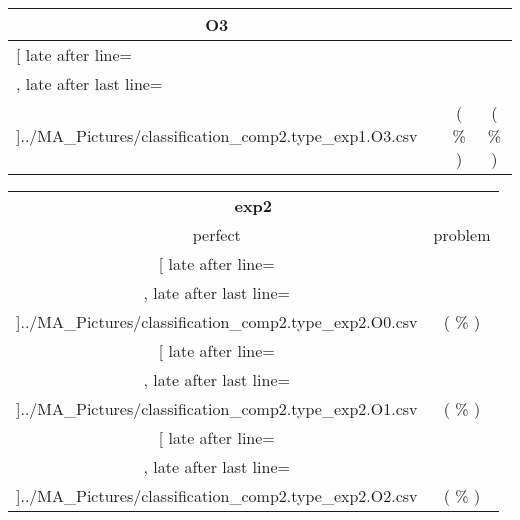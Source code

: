 \begin{table}[!htbp]
{\begin{tabular}{l|c|c|c}
\multicolumn{1}{c}{\bfseries O3}
	\\\midrule
	\csvreader[ late after line=\\, late after last line=\\\bottomrule]{../MA_Pictures/classification_comp2.type_exp1.O3.csv}{
}
	{\csvcolii  &  \csvcoliii & \csvcoliv ( \csvcolv \% ) & \csvcolvi( \csvcolvii\% )}%


    	\end{tabular}

	\begin{tabular}{|c|c}%

	\toprule
    \multicolumn{2}{c}{\bfseries exp2}\\
	
	     perfect &  problem %
	\\\midrule
	\csvreader[ late after line=\\, late after last line=\\\midrule]{../MA_Pictures/classification_comp2.type_exp2.O0.csv}{
}
	{\csvcoliv ( \csvcolv \% ) & \csvcolvi( \csvcolvii\% )}%
\multicolumn{1}{c}{}

	\\\midrule
	\csvreader[ late after line=\\, late after last line=\\\midrule]{../MA_Pictures/classification_comp2.type_exp2.O1.csv}{
}
	{\csvcoliv ( \csvcolv \% ) & \csvcolvi( \csvcolvii\% )}%
	
	\multicolumn{1}{c}{}

	\\\midrule
	\csvreader[ late after line=\\, late after last line=\\\midrule]{../MA_Pictures/classification_comp2.type_exp2.O2.csv}{
}
	{\csvcoliv ( \csvcolv \% ) & \csvcolvi( \csvcolvii\% )}%
	

\end{tabular}}
\end{table}
